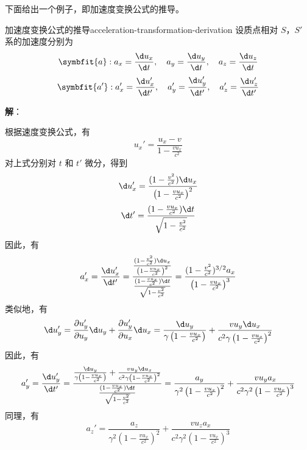 下面给出一个例子，即加速度变换公式的推导。
\begin{example}{加速度变换公式的推导}{acceleration-transformation-derivation}
    设质点相对 $S$，$S'$ 系的加速度分别为
    \begin{equation}
        \symbfit{a} : a_x = \frac{\d u_x}{\d t} , \quad a_y = \frac{\d u_y}{\d t} , \quad a_z = \frac{\d u_z}{\d t}
    \end{equation}
    \begin{equation}
        \symbfit{a'} : a_x' = \frac{\d u_x'}{\d t'} , \quad a_y' = \frac{\d u_y'}{\d t'} , \quad a_z' = \frac{\d u_z'}{\d t'}
    \end{equation}

    \textbf{解}：

    根据速度变换公式，有
    \begin{equation}
        u_x' = \frac{u_x - v}{1 - \frac{v u_x}{c^2}}
    \end{equation}
    对上式分别对 $t$ 和 $t'$ 微分，得到
    \begin{equation}
        \d u_x' = \frac{(1 - \frac{v^2}{c^2}) \d u_x}{\left(1 - \frac{v u_x}{c^2}\right)^2}
    \end{equation}
    \begin{equation}
        \d t' = \frac{(1 - \frac{v u_x}{c^2}) \d t}{\sqrt{1 - \frac{v^2}{c^2}}}
    \end{equation}
    因此，有
    \begin{equation}
        a_x' = \frac{\d u_x'}{\d t'} = \frac{\frac{(1 - \frac{v^2}{c^2}) \d u_x}{\left(1 - \frac{v u_x}{c^2}\right)^2}}{\frac{(1 - \frac{v u_x}{c^2}) \d t}{\sqrt{1 - \frac{v^2}{c^2}}}} = \frac{(1 - \frac{v^2}{c^2})^{3/2} a_x}{\left(1 - \frac{v u_x}{c^2}\right)^3}
    \end{equation}
    类似地，有
    \begin{equation}
        \d u_y' = \frac{\partial u_y'}{\partial u_y} \d u_y + \frac{\partial u_y'}{\partial u_x} \d u_x = \frac{\d u_y}{\gamma \left(1 - \frac{v u_x}{c^2}\right)} + \frac{v u_y \d u_x}{c^2 \gamma \left(1 - \frac{v u_x}{c^2}\right)^2}
    \end{equation}
    因此，有
    \begin{equation}
        a_y' = \frac{\d u_y'}{\d t'} = \frac{\frac{\d u_y}{\gamma \left(1 - \frac{v u_x}{c^2}\right)} + \frac{v u_y \d u_x}{c^2 \gamma \left(1 - \frac{v u_x}{c^2}\right)^2}}{\frac{(1 - \frac{v u_x}{c^2}) \d t}{\sqrt{1 - \frac{v^2}{c^2}}}} = \frac{a_y}{\gamma^2 \left(1 - \frac{v u_x}{c^2}\right)^2} + \frac{v u_y a_x}{c^2 \gamma^2 \left(1 - \frac{v u_x}{c^2}\right)^3}
    \end{equation}
    同理，有
    \begin{equation}
        a_z' = \frac{a_z}{\gamma^2 \left(1 - \frac{v u_x}{c^2}\right)^2} + \frac{v u_z a_x}{c^2 \gamma^2 \left(1 - \frac{v u_x}{c^2}\right)^3}
    \end{equation}


\end{example}
